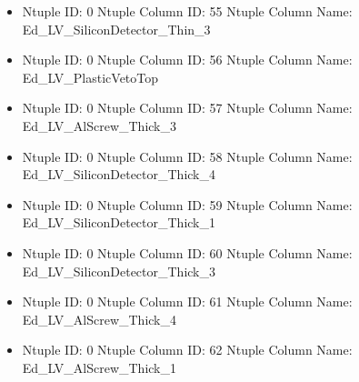 \documentclass[8pt]{beamer}
\begin{document}
\begin{frame}
\begin{itemize}
        \item Ntuple ID: 0 Ntuple Column ID: 55 Ntuple Column Name: Ed\_LV\_SiliconDetector\_Thin\_3
        
        \item Ntuple ID: 0 Ntuple Column ID: 56 Ntuple Column Name: Ed\_LV\_PlasticVetoTop
        
        \item Ntuple ID: 0 Ntuple Column ID: 57 Ntuple Column Name: Ed\_LV\_AlScrew\_Thick\_3
        
        \item Ntuple ID: 0 Ntuple Column ID: 58 Ntuple Column Name: Ed\_LV\_SiliconDetector\_Thick\_4
        
        \item Ntuple ID: 0 Ntuple Column ID: 59 Ntuple Column Name: Ed\_LV\_SiliconDetector\_Thick\_1
        
        \item Ntuple ID: 0 Ntuple Column ID: 60 Ntuple Column Name: Ed\_LV\_SiliconDetector\_Thick\_3
        
        \item Ntuple ID: 0 Ntuple Column ID: 61 Ntuple Column Name: Ed\_LV\_AlScrew\_Thick\_4
        
        \item Ntuple ID: 0 Ntuple Column ID: 62 Ntuple Column Name: Ed\_LV\_AlScrew\_Thick\_1
        
        \end{itemize}
        
            \end{frame}
            
\end{document}
